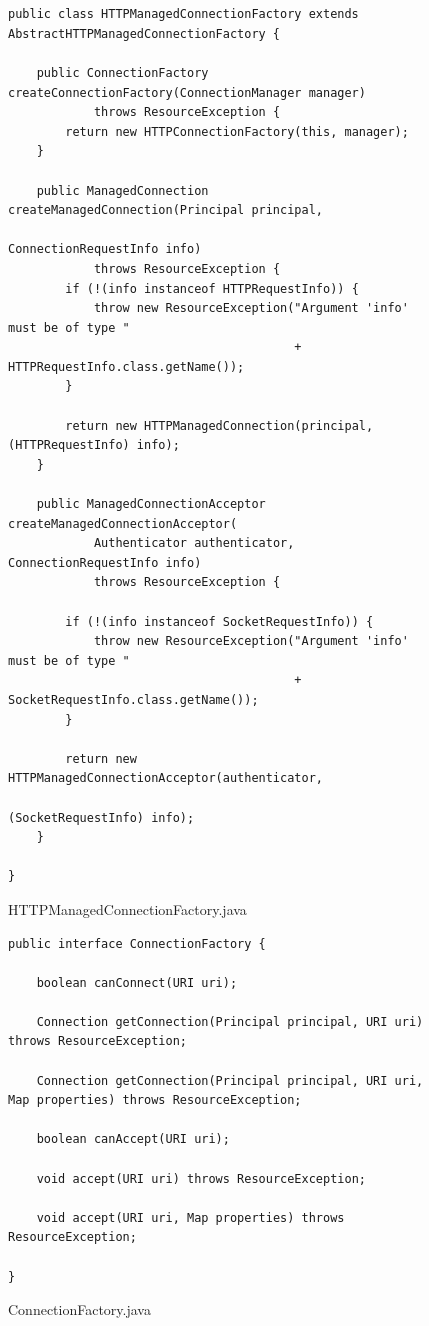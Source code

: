 \begin{figure}[!tbp]
\centering
\lstset{language=Java, stepnumber=1, showspaces=false, showstringspaces=false,breaklines=true}
\begin{lstlisting}


public class HTTPManagedConnectionFactory extends AbstractHTTPManagedConnectionFactory {

    public ConnectionFactory createConnectionFactory(ConnectionManager manager)
            throws ResourceException {
        return new HTTPConnectionFactory(this, manager);
    }

    public ManagedConnection createManagedConnection(Principal principal,
                                                     ConnectionRequestInfo info)
            throws ResourceException {
        if (!(info instanceof HTTPRequestInfo)) {
            throw new ResourceException("Argument 'info' must be of type "
                                        + HTTPRequestInfo.class.getName());
        }

        return new HTTPManagedConnection(principal, (HTTPRequestInfo) info);
    }

    public ManagedConnectionAcceptor createManagedConnectionAcceptor(
            Authenticator authenticator, ConnectionRequestInfo info)
            throws ResourceException {

        if (!(info instanceof SocketRequestInfo)) {
            throw new ResourceException("Argument 'info' must be of type "
                                        + SocketRequestInfo.class.getName());
        }

        return new HTTPManagedConnectionAcceptor(authenticator,
                                                 (SocketRequestInfo) info);
    }

}
\end{lstlisting}
\caption{HTTPManagedConnectionFactory.java}
\label{}
\end{figure}


\begin{figure}[!tbp]
\centering
\lstset{language=Java, stepnumber=1, showspaces=false, showstringspaces=false,breaklines=true}
\begin{lstlisting}
public interface ConnectionFactory {

    boolean canConnect(URI uri);

    Connection getConnection(Principal principal, URI uri) throws ResourceException;

    Connection getConnection(Principal principal, URI uri, Map properties) throws ResourceException;

    boolean canAccept(URI uri);

    void accept(URI uri) throws ResourceException;

    void accept(URI uri, Map properties) throws ResourceException;

}
\end{lstlisting}
\caption{ConnectionFactory.java}
\label{}
\end{figure}

